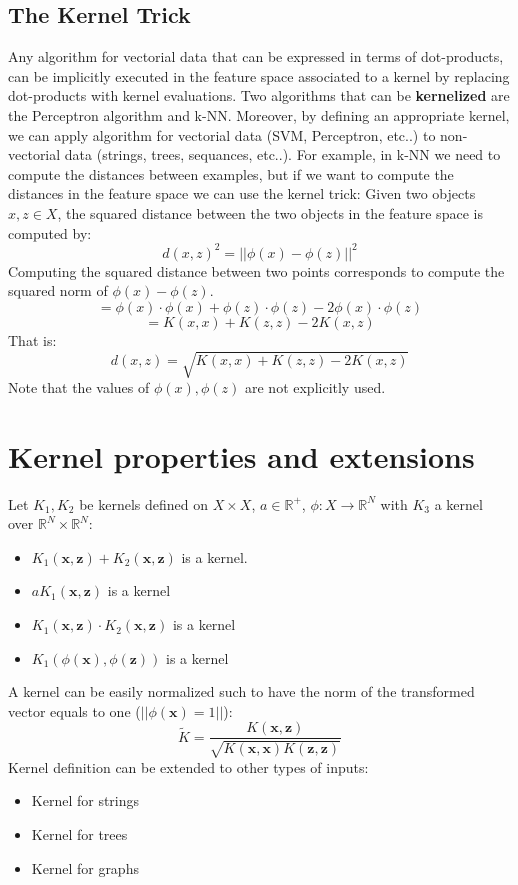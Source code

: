 \subsection{The Kernel Trick}
Any algorithm for vectorial data that can be expressed in terms of dot-products, can be implicitly executed in the feature space associated to a kernel by replacing dot-products with kernel evaluations. Two algorithms that can be \textbf{kernelized} are the Perceptron algorithm and k-NN.\newline\newline 
Moreover, by defining an appropriate kernel, we can apply algorithm for vectorial data (SVM, Perceptron, etc..) to non-vectorial data (strings, trees, sequances, etc..).\newline\newline
For example, in k-NN we need to compute the distances between examples, but if we want to compute the distances in the feature space we can use the kernel trick: Given two objects $x, z \in X$, the squared distance between the two objects in the feature space is computed by:
\[d(x,z)^{2} = ||\phi(x) - \phi(z)||^{2}\]
Computing the squared distance between two points corresponds to compute the squared norm of $\phi(x) - \phi(z)$.
\[= \phi(x) \cdot \phi(x) + \phi(z) \cdot \phi(z) - 2\phi(x) \cdot \phi(z)\]
\[= K(x, x) + K(z, z) - 2K(x, z)\]
That is:
\[d(x, z) = \sqrt{K(x, x) + K(z, z) - 2K(x, z)}\]
Note that the values of $\phi(x), \phi(z)$ are not explicitly used.

\section{Kernel properties and extensions}
Let $K_{1}, K_{2}$ be kernels defined on $X \times X$, $a \in \mathbb{R}^{+}$, $\phi : X \rightarrow \mathbb{R}^{N}$ with $K_{3}$ a kernel over $\mathbb{R}^{N} \times \mathbb{R}^{N}$:
\begin{itemize}
    \item $K_{1}(\textbf{x}, \textbf{z}) + K_{2}(\textbf{x}, \textbf{z})$ is a kernel.
    
    \item $aK_{1}(\textbf{x}, \textbf{z})$ is a kernel

    \item $K_{1}(\textbf{x}, \textbf{z}) \cdot K_{2}(\textbf{x}, \textbf{z})$ is a kernel

    \item $K_{1}(\phi(\textbf{x}), \phi(\textbf{z}))$ is a kernel
\end{itemize}
A kernel can be easily normalized such to have the norm of the transformed vector equals to one ($||\phi(\textbf{x}) = 1||$):
\[\tilde{K} = \frac{K(\textbf{x}, \textbf{z})}{\sqrt{K(\textbf{x},\textbf{x}) K(\textbf{z},\textbf{z})}}\]
Kernel definition can be extended to other types of inputs:
\begin{itemize}
    \item Kernel for strings
    \item Kernel for trees
    \item Kernel for graphs
\end{itemize}
